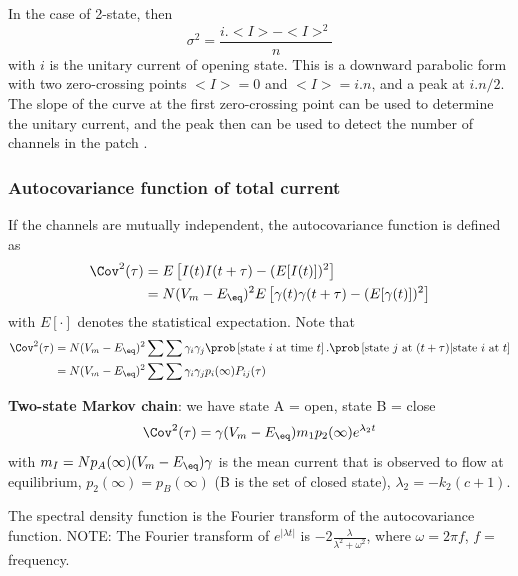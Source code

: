 In the case of 2-state, then
\begin{equation}
\sigma^2 = \frac{i.<I> - <I>^2}{n}
\end{equation}
with $i$ is the unitary current of opening state. This is a downward parabolic
form with two zero-crossing points $<I>=0$ and $<I>=i.n$, and a peak at $i.n/2$.
The slope of the curve at the first zero-crossing point can be used to determine
the unitary current, and the peak then can be used to detect the number of
channels in the patch \citep{qin2007}.

\subsubsection{Autocovariance function of total current}

If the channels are mutually independent, the autocovariance function is defined
as
\begin{equation}
\begin{split}
\Cov^2(\tau) &= E\left[I(t)I(t+\tau)-(E[I(t)])^2 \right] \\
 &= N(V_m - E_\eq)^2 E\left[\gamma(t)\gamma(t+\tau) - (E[\gamma(t)])^2 \right]
\end{split}
\end{equation}
with $E[\cdot]$ denotes the statistical expectation. Note that
\begin{equation}
\begin{split}
\Cov^2(\tau)
 &= N(V_m - E_\eq)^2 \sum\sum \gamma_i\gamma_j
 \prob\left[ \text{state $i$ at time $t$} \right].\prob\left[ \text{state $j$
 at ($t+\tau$)}| \text{state $i$ at $t$} \right] \\
 &= N(V_m - E_\eq)^2 \sum\sum \gamma_i\gamma_j p_i(\infty) P_{ij}(\tau)
\end{split}
\end{equation}


{\bf Two-state Markov chain}: we have state A = open, state B = close
\begin{equation}
\Cov^2(\tau) = \gamma (V_m-E_\eq) m_1p_2(\infty) e^{\lambda_2 t}
\end{equation}
with $m_I = Np_A(\infty)(V_m-E_\eq)\gamma$ is the mean current that is observed
to flow at equilibrium, $p_2(\infty)= p_B(\infty)$ (B is the set of closed
state), $\lambda_2 = -k_2(c+1)$.

\begin{framed}
The spectral density function is the Fourier transform of the autocovariance
function. NOTE: The Fourier transform of $e^{|\lambda t|}$ is
$-2\frac{\lambda}{\lambda^2+\omega^2}$, where $\omega = 2\pi f$, $f=$ frequency.
\end{framed}



